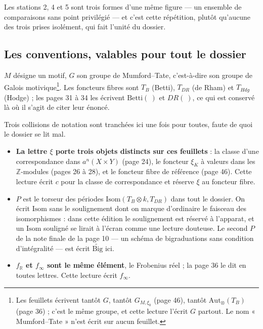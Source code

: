 \documentclass[11pt,a4paper]{article}
\begin{document}
Les stations 2, 4 et 5 sont trois formes d'une même figure — un ensemble de
comparaisons sans point privilégié — et c'est cette répétition, plutôt qu'aucune
des trois prises isolément, qui fait l'unité du dossier.

\subsection*{Les conventions, valables pour tout le dossier}

$M$ désigne un motif, $G$ son groupe de Mumford--Tate, c'est-à-dire son groupe
de Galois motivique\footnote{Les feuillets écrivent tantôt $G$, tantôt
$G_{M,\xi_{0}}$ (page 46), tantôt $\mathrm{Aut}_{\otimes}(T_{B})$ (page 36) ;
c'est le même groupe, et cette lecture l'écrit $G$ partout. Le nom
« Mumford--Tate » n'est écrit sur aucun feuillet.}. Les foncteurs fibres sont
$T_{B}$ (Betti), $T_{DR}$ (de Rham) et $T_{Hdg}$ (Hodge) ; les pages 31 à 34
les écrivent $\mathrm{Betti}(\ )$ et $DR(\ )$, ce qui est conservé là où il
s'agit de citer leur énoncé.

Trois collisions de notation sont tranchées ici une fois pour toutes, faute de
quoi le dossier se lit mal.

\begin{itemize}
  \item \textbf{La lettre $\xi$ porte trois objets distincts sur ces
        feuillets} : la classe d'une correspondance dans $a^{n}(X \times Y)$
        (page 24), le foncteur $\xi_{K}$ à valeurs dans les $\mathbb{Z}$-modules
        (pages 26 à 28), et le foncteur fibre de référence (page 46). Cette
        lecture écrit $c$ pour la classe de correspondance et réserve $\xi$ au
        foncteur fibre.
  \item \textbf{$P$} est le torseur des périodes
        $\mathrm{Isom}(T_{B} \otimes k, T_{DR})$ dans tout le
        dossier. On écrit $\mathrm{Isom}$ sans le soulignement dont on marque
        d'ordinaire le faisceau des isomorphismes : dans cette édition le
        soulignement est réservé à l'apparat, et un $\mathrm{Isom}$ souligné se
        lirait à l'écran comme une lecture douteuse. Le second $P$ de la note finale de la page 10 — un schéma de
        bigraduations sans condition d'intégralité — est écrit
        $\widetilde{\mathrm{Big}}$ ici.
  \item \textbf{$f_{\mathbb{R}}$ et $f_{\infty}$ sont le même élément}, le
        Frobenius réel ; la page 36 le dit en toutes lettres. Cette lecture
        écrit $f_{\infty}$.
\end{itemize}
\end{document}
